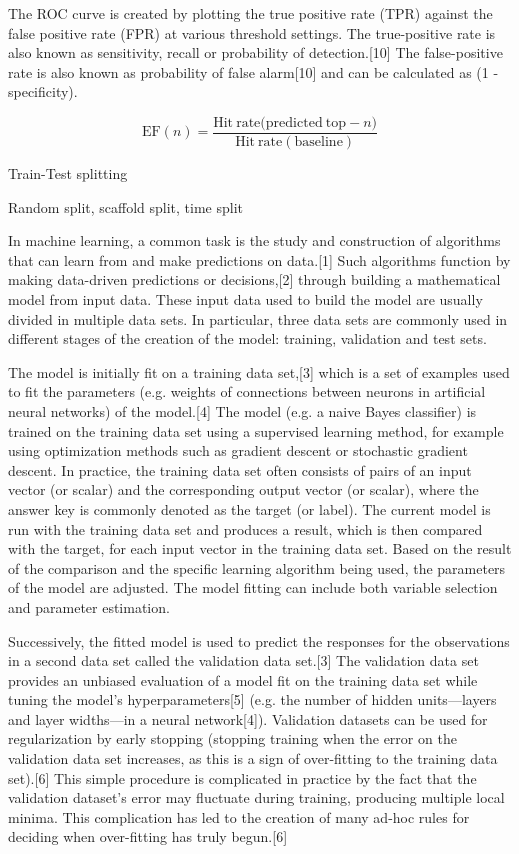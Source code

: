 The ROC curve is created by plotting the true positive rate (TPR) against the false positive rate (FPR) at various threshold settings. The true-positive rate is also known as sensitivity, recall or probability of detection.[10] The false-positive rate is also known as probability of false alarm[10] and can be calculated as (1 - specificity).

\begin{equation}
    \mathrm{EF}(n) = \frac{\mathrm{Hit\: rate (predicted\: top - }n)}{\mathrm{Hit\: rate (baseline)}}
\end{equation}

Train-Test splitting

Random split, scaffold split, time split

In machine learning, a common task is the study and construction of algorithms that can learn from and make predictions on data.[1] Such algorithms function by making data-driven predictions or decisions,[2] through building a mathematical model from input data. These input data used to build the model are usually divided in multiple data sets. In particular, three data sets are commonly used in different stages of the creation of the model: training, validation and test sets.

The model is initially fit on a training data set,[3] which is a set of examples used to fit the parameters (e.g. weights of connections between neurons in artificial neural networks) of the model.[4] The model (e.g. a naive Bayes classifier) is trained on the training data set using a supervised learning method, for example using optimization methods such as gradient descent or stochastic gradient descent. In practice, the training data set often consists of pairs of an input vector (or scalar) and the corresponding output vector (or scalar), where the answer key is commonly denoted as the target (or label). The current model is run with the training data set and produces a result, which is then compared with the target, for each input vector in the training data set. Based on the result of the comparison and the specific learning algorithm being used, the parameters of the model are adjusted. The model fitting can include both variable selection and parameter estimation.

Successively, the fitted model is used to predict the responses for the observations in a second data set called the validation data set.[3] The validation data set provides an unbiased evaluation of a model fit on the training data set while tuning the model's hyperparameters[5] (e.g. the number of hidden units—layers and layer widths—in a neural network[4]). Validation datasets can be used for regularization by early stopping (stopping training when the error on the validation data set increases, as this is a sign of over-fitting to the training data set).[6] This simple procedure is complicated in practice by the fact that the validation dataset's error may fluctuate during training, producing multiple local minima. This complication has led to the creation of many ad-hoc rules for deciding when over-fitting has truly begun.[6]

